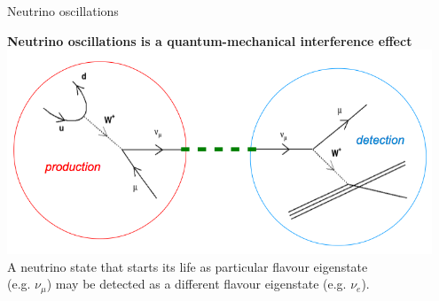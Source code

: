 %


%
%
%

\begin{frame}{Neutrino oscillations}

   \begin{center}
   {\bf Neutrino oscillations is a quantum-mechanical interference effect}\\
   \vspace{0.3cm}
   \includegraphics[width=0.95\textwidth]{./images/osc101/osc_schematic.png}\\
   \vspace{0.3cm}
   A neutrino state that starts its life as particular flavour eigenstate\\ (e.g. $\nu_{\mu}$)
   may be detected as a different flavour eigenstate (e.g. $\nu_{e}$).\\
   \end{center}

\end{frame}


